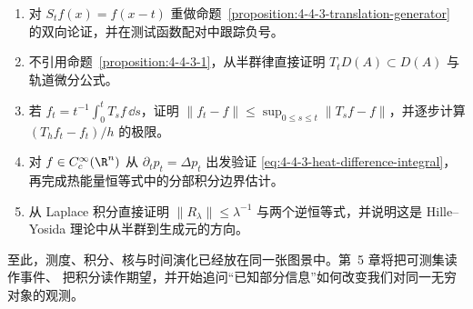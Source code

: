 \begin{exercise}
\begin{enumerate}
  \item 对 $S_tf(x)=f(x-t)$ 重做命题~\ref{proposition:4-4-3-translation-generator}
        的双向论证，并在测试函数配对中跟踪负号。
  \item 不引用命题~\ref{proposition:4-4-3-1}，从半群律直接证明
        $T_tD(A)\subset D(A)$ 与轨道微分公式。
  \item 若 $f_t=t^{-1}\int_0^tT_sf\,\dd s$，证明
        $\|f_t-f\|\le\sup_{0\le s\le t}\|T_sf-f\|$，并逐步计算
        $(T_hf_t-f_t)/h$ 的极限。
  \item 对 $f\in C_c^\infty(\R^n)$ 从 $\partial_tp_t=\Delta p_t$ 出发验证
        \eqref{eq:4-4-3-heat-difference-integral}，再完成热能量恒等式中的分部积分边界估计。
  \item 从 Laplace 积分直接证明
        $\|R_\lambda\|\le\lambda^{-1}$ 与两个逆恒等式，并说明这是
        Hille--Yosida 理论中从半群到生成元的方向。
\end{enumerate}
\end{exercise}

至此，测度、积分、核与时间演化已经放在同一张图景中。第~5 章将把可测集读作事件、
把积分读作期望，并开始追问“已知部分信息”如何改变我们对同一无穷对象的观测。
